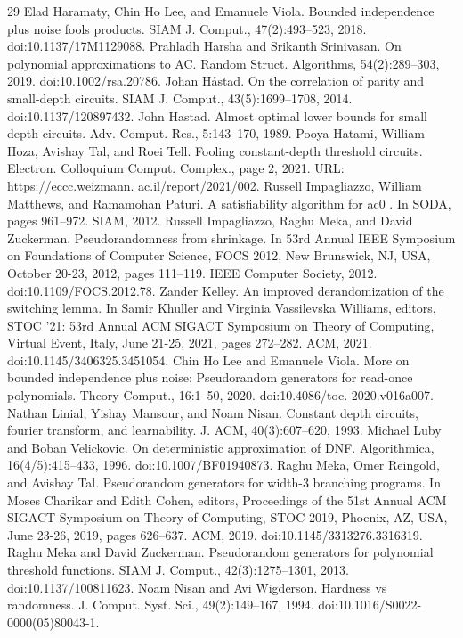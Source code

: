 \documentclass[10pt,a4paper]{article}
\begin{document}
\begin{thebibliography}{29}
 Elad Haramaty, Chin Ho Lee, and Emanuele Viola. Bounded independence plus noise fools products. SIAM J. Comput., 47(2):493–523, 2018. doi:10.1137/17M1129088.
 Prahladh Harsha and Srikanth Srinivasan. On polynomial approximations to AC. Random Struct. Algorithms, 54(2):289–303, 2019. doi:10.1002/rsa.20786.
 Johan Håstad. On the correlation of parity and small-depth circuits. SIAM J. Comput., 43(5):1699–1708, 2014. doi:10.1137/120897432.
 John Hastad. Almost optimal lower bounds for small depth circuits. Adv. Comput. Res., 5:143–170, 1989.
 Pooya Hatami, William Hoza, Avishay Tal, and Roei Tell. Fooling constant-depth threshold circuits. Electron. Colloquium Comput. Complex., page 2, 2021. URL: https://eccc.weizmann. ac.il/report/2021/002.
 Russell Impagliazzo, William Matthews, and Ramamohan Paturi. A satisfiability algorithm for ac0 . In SODA, pages 961–972. SIAM, 2012.
 Russell Impagliazzo, Raghu Meka, and David Zuckerman. Pseudorandomness from shrinkage. In 53rd Annual IEEE Symposium on Foundations of Computer Science, FOCS 2012, New Brunswick, NJ, USA, October 20-23, 2012, pages 111–119. IEEE Computer Society, 2012. doi:10.1109/FOCS.2012.78.
 Zander Kelley. An improved derandomization of the switching lemma. In Samir Khuller and Virginia Vassilevska Williams, editors, STOC ’21: 53rd Annual ACM SIGACT Symposium on Theory of Computing, Virtual Event, Italy, June 21-25, 2021, pages 272–282. ACM, 2021. doi:10.1145/3406325.3451054.
 Chin Ho Lee and Emanuele Viola. More on bounded independence plus noise: Pseudorandom generators for read-once polynomials. Theory Comput., 16:1–50, 2020. doi:10.4086/toc. 2020.v016a007.
 Nathan Linial, Yishay Mansour, and Noam Nisan. Constant depth circuits, fourier transform, and learnability. J. ACM, 40(3):607–620, 1993.
 Michael Luby and Boban Velickovic. On deterministic approximation of DNF. Algorithmica, 16(4/5):415–433, 1996. doi:10.1007/BF01940873.
 Raghu Meka, Omer Reingold, and Avishay Tal. Pseudorandom generators for width-3 branching programs. In Moses Charikar and Edith Cohen, editors, Proceedings of the 51st Annual ACM SIGACT Symposium on Theory of Computing, STOC 2019, Phoenix, AZ, USA, June 23-26, 2019, pages 626–637. ACM, 2019. doi:10.1145/3313276.3316319.
 Raghu Meka and David Zuckerman. Pseudorandom generators for polynomial threshold functions. SIAM J. Comput., 42(3):1275–1301, 2013. doi:10.1137/100811623.
 Noam Nisan and Avi Wigderson. Hardness vs randomness. J. Comput. Syst. Sci., 49(2):149–167, 1994. doi:10.1016/S0022-0000(05)80043-1.

\end{thebibliography}
\end{document}
